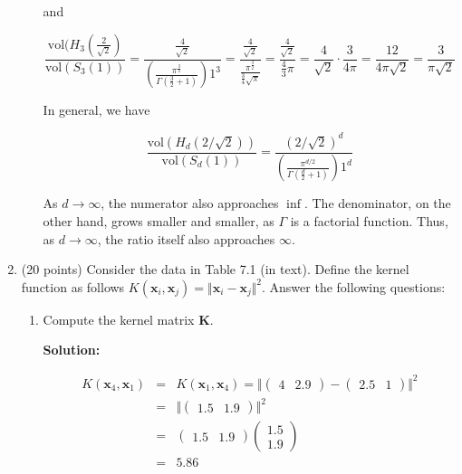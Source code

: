 \documentclass[11pt]{article}
\begin{document}
\begin{enumerate}
\begin{enumerate}
and

\begin{equation}
\frac{\text{vol}(H_3(\frac{2}{\sqrt{2}})}{\text{vol}(S_3(1))} = \frac{\frac{4}{\sqrt{2}}}{\left(\frac{\pi^\frac{3}{2}}{\Gamma(\frac{3}{2}+1)}\right)1^3} = \frac{\frac{4}{\sqrt{2}}}{\frac{\pi^\frac{3}{2}}{\frac{3}{4}\sqrt{\pi}}} = \frac{\frac{4}{\sqrt{2}}}{\frac{4}{3}\pi} = \frac{4}{\sqrt{2}} \cdot \frac{3}{4\pi} = \frac{12}{4\pi\sqrt{2}} = \frac{3}{\pi\sqrt{2}}
\end{equation}

In general, we have

\begin{equation}
\frac{\text{vol}(H_d(2/\sqrt{2}))}{\text{vol}(S_d(1))} = \frac{(2/\sqrt{2})^d}{\left(\frac{\pi^{d/2}}{\Gamma\left(\frac{d}{2}+1\right)}\right)1^d}
\end{equation}

As $d \rightarrow \infty$, the numerator also approaches $\inf$. The denominator, on the other hand, grows smaller and smaller, as $\Gamma$ is a factorial function. Thus, as $d \rightarrow \infty$, the ratio itself also approaches $\infty$.

\end{enumerate}

\item (20 points) Consider the data in Table 7.1 (in text). Define the kernel function as follows $K(\mathbf{x}_i, \mathbf{x}_j) = \Vert \mathbf{x}_i - \mathbf{x}_j \Vert^2$. Answer the following questions:

\begin{enumerate}
\item Compute the kernel matrix $\mathbf{K}$.

\textbf{Solution:}

\begin{eqnarray*}
K(\mathbf{x}_4, \mathbf{x}_1) &=& K(\mathbf{x}_1, \mathbf{x}_4) = \Vert (\begin{array}{cc}4 & 2.9 \end{array}) - (\begin{array}{cc}2.5 & 1 \end{array}) \Vert^2 \\
&=& \Vert (\begin{array}{cc} 1.5 & 1.9 \end{array}) \Vert^2 \\
&=& (\begin{array}{cc} 1.5 & 1.9 \end{array}) \left(\begin{array}{c} 1.5 \\ 1.9 \end{array}\right) \\
&=& 5.86
\end{eqnarray*}


\end{enumerate}
\end{enumerate}
\end{document}
